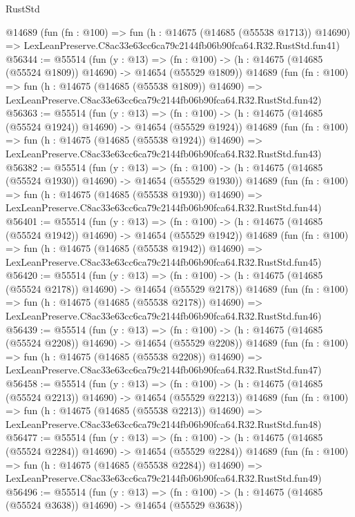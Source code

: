 \begin{lexlean}{RustStd}
\begin{coremodule}
    @14689
    (fun (fn : @100) =>
    fun (h : @14675 (@14685 (@55538 @1713)) @14690) =>
    LexLeanPreserve.C8ac33e63cc6ca79c2144fb06b90fca64.R32.RustStd.fun41)
@56344 := @55514
    (fun (y : @13) =>
    (fn : @100) -> (h : @14675 (@14685 (@55524 @1809)) @14690) -> @14654 (@55529 @1809))
    @14689
    (fun (fn : @100) =>
    fun (h : @14675 (@14685 (@55538 @1809)) @14690) =>
    LexLeanPreserve.C8ac33e63cc6ca79c2144fb06b90fca64.R32.RustStd.fun42)
@56363 := @55514
    (fun (y : @13) =>
    (fn : @100) -> (h : @14675 (@14685 (@55524 @1924)) @14690) -> @14654 (@55529 @1924))
    @14689
    (fun (fn : @100) =>
    fun (h : @14675 (@14685 (@55538 @1924)) @14690) =>
    LexLeanPreserve.C8ac33e63cc6ca79c2144fb06b90fca64.R32.RustStd.fun43)
@56382 := @55514
    (fun (y : @13) =>
    (fn : @100) -> (h : @14675 (@14685 (@55524 @1930)) @14690) -> @14654 (@55529 @1930))
    @14689
    (fun (fn : @100) =>
    fun (h : @14675 (@14685 (@55538 @1930)) @14690) =>
    LexLeanPreserve.C8ac33e63cc6ca79c2144fb06b90fca64.R32.RustStd.fun44)
@56401 := @55514
    (fun (y : @13) =>
    (fn : @100) -> (h : @14675 (@14685 (@55524 @1942)) @14690) -> @14654 (@55529 @1942))
    @14689
    (fun (fn : @100) =>
    fun (h : @14675 (@14685 (@55538 @1942)) @14690) =>
    LexLeanPreserve.C8ac33e63cc6ca79c2144fb06b90fca64.R32.RustStd.fun45)
@56420 := @55514
    (fun (y : @13) =>
    (fn : @100) -> (h : @14675 (@14685 (@55524 @2178)) @14690) -> @14654 (@55529 @2178))
    @14689
    (fun (fn : @100) =>
    fun (h : @14675 (@14685 (@55538 @2178)) @14690) =>
    LexLeanPreserve.C8ac33e63cc6ca79c2144fb06b90fca64.R32.RustStd.fun46)
@56439 := @55514
    (fun (y : @13) =>
    (fn : @100) -> (h : @14675 (@14685 (@55524 @2208)) @14690) -> @14654 (@55529 @2208))
    @14689
    (fun (fn : @100) =>
    fun (h : @14675 (@14685 (@55538 @2208)) @14690) =>
    LexLeanPreserve.C8ac33e63cc6ca79c2144fb06b90fca64.R32.RustStd.fun47)
@56458 := @55514
    (fun (y : @13) =>
    (fn : @100) -> (h : @14675 (@14685 (@55524 @2213)) @14690) -> @14654 (@55529 @2213))
    @14689
    (fun (fn : @100) =>
    fun (h : @14675 (@14685 (@55538 @2213)) @14690) =>
    LexLeanPreserve.C8ac33e63cc6ca79c2144fb06b90fca64.R32.RustStd.fun48)
@56477 := @55514
    (fun (y : @13) =>
    (fn : @100) -> (h : @14675 (@14685 (@55524 @2284)) @14690) -> @14654 (@55529 @2284))
    @14689
    (fun (fn : @100) =>
    fun (h : @14675 (@14685 (@55538 @2284)) @14690) =>
    LexLeanPreserve.C8ac33e63cc6ca79c2144fb06b90fca64.R32.RustStd.fun49)
@56496 := @55514
    (fun (y : @13) =>
    (fn : @100) -> (h : @14675 (@14685 (@55524 @3638)) @14690) -> @14654 (@55529 @3638))

\end{coremodule}
\end{lexlean}
